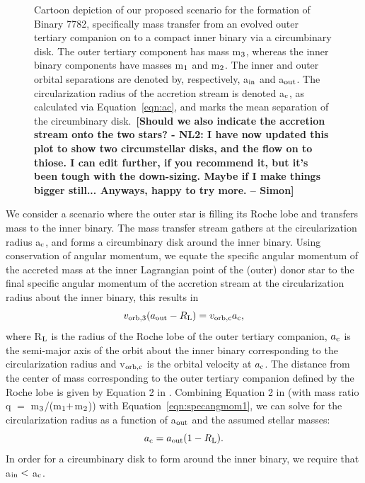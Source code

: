 \documentclass{aastex62}
\def\simon#1{{\bf {\color{red}[#1 -- Simon]}}}
\begin{document}
\begin{figure}[ht!]
\caption{Cartoon depiction of our proposed scenario for the formation
  of Binary 7782, specifically mass transfer from an evolved outer
  tertiary companion on to a compact inner binary via a circumbinary
  disk.  The outer tertiary component has mass m$_{\rm 3}$, whereas
  the inner binary components have masses m$_{\rm 1}$ and m$_{\rm 2}$.
  The inner and outer orbital separations are denoted by,
  respectively, a$_{\rm in}$ and a$_{\rm out}$.  The circularization
  radius of the accretion stream is denoted a$_{\rm c}$, as calculated
  via Equation~\ref{eqn:ac}, and marks the mean separation of the
  circumbinary disk.\
  \simon{Should we also indicate the accretion stream onto the two stars? - NL2:  I have now updated this plot to show two circumstellar disks, and the flow on to thiose.  I can edit further, if you recommend it, but it's been tough with the down-sizing.  Maybe if I make things bigger still...  Anyways, happy to try more.}
\label{fig:fig1}}
\end{figure}

We consider a scenario where the outer star is filling its Roche lobe
and transfers mass to the inner binary.  The mass transfer stream
gathers at the circularization radius a$_{\rm c}$, and forms a circumbinary disk
around the inner binary.  Using conservation of angular momentum, we
equate the specific angular momentum of the accreted mass at the inner
Lagrangian point of the (outer) donor star to the final specific
angular momentum of the accretion stream at the circularization radius
about the inner binary, this results in
\begin{equation}
\label{eqn:specangmom1}
v_{\rm orb,3}(a_{\rm out} - R_{\rm L}) = v_{\rm orb,c}a_{\rm c},
\end{equation}
where R$_{\rm L}$ is the radius of the Roche lobe of the outer
tertiary companion, $a_{\rm c}$ is the semi-major axis of the orbit
about the inner binary corresponding to the circularization radius and
v$_{\rm orb,c}$ is the orbital velocity at $a_{\rm c}$.  The distance
from the center of mass corresponding to the outer tertiary companion
defined by the Roche lobe is given by Equation 2 in
\citep{eggleton83}.  Combining Equation 2 in \citet{eggleton83} (with
mass ratio q $=$ m$_{\rm 3}$/(m$_{\rm 1} +$m$_{\rm 2}$)) with
Equation~\ref{eqn:specangmom1}, we can solve for the circularization
radius as a function of a$_{\rm out}$ and the assumed stellar masses:
\begin{equation}
\label{eqn:ac}
a_{\rm c} = a_{\rm out}(1 - R_{\rm L}).
\end{equation}
In order for a circumbinary disk to form around the inner binary, we
require that a$_{\rm in} <$ a$_{\rm c}$.
\end{document}
